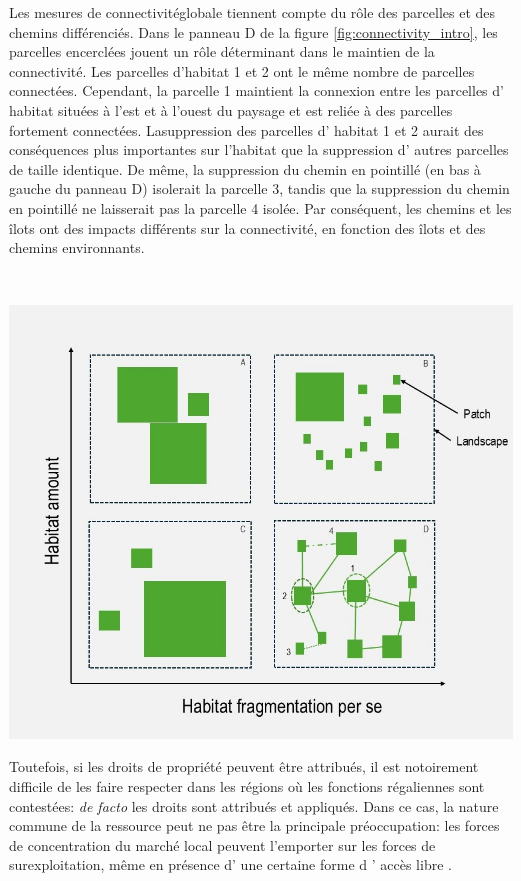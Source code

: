 \begin{displayquote}
\begin{displayquote}
\begin{displayquote}
\begin{tcolorbox}[breakable, 
colback =verylightgray, 
colframe=gray!75!black,
title={Box 2 - Habitat Loss, Fragmentation and Connectivity},
fontupper=\small]
   Les mesures de connectivitéglobale tiennent compte du rôle des parcelles et des chemins différenciés. Dans le panneau D de la figure \ref{fig:connectivity_intro}, les parcelles encerclées jouent un rôle déterminant dans le maintien de la connectivité. Les parcelles d'habitat 1 et 2 ont le même nombre de parcelles connectées.     Cependant, la parcelle 1 maintient la connexion entre les parcelles d' habitat situées à l'est et à l'ouest du paysage et est reliée à des parcelles fortement connectées. Lasuppression des parcelles d' habitat 1 et 2 aurait des conséquences plus importantes sur l'habitat que la suppression d' autres parcelles de taille identique.     De même, la suppression du chemin en pointillé (en bas à gauche du panneau D) isolerait la parcelle 3, tandis que la suppression du chemin en pointillé ne laisserait pas la parcelle 4 isolée. Par conséquent, les chemins et les îlots ont des impacts différents sur la connectivité, en fonction des îlots et des chemins environnants.

\\%
\begin{center}
\includegraphics[width = .8\textwidth]{figures/intro/fragmentation.jpg}
\label{fig:connectivity_intro}
\end{center}
\end{tcolorbox}

 
  Toutefois, si les droits de propriété peuvent être attribués, il est notoirement difficile de les faire respecter dans les régions où les fonctions régaliennes sont contestées:     \textit{de facto} les droits sont attribués et appliqués. Dans ce cas, la nature commune de la ressource peut ne pas être la principale préoccupation: les forces de concentration du marché local peuvent l'emporter sur les forces de surexploitation, même en présence d' une certaine forme d ' accès libre \citep{damania_economics_2007}. 


\end{displayquote}
\end{displayquote}
\end{displayquote}
